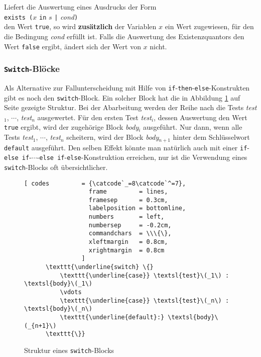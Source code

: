 \remark
Liefert die Auswertung eines Ausdrucks der Form
\\[0.2cm]
\hspace*{1.3cm}
\texttt{exists (}$x$ \texttt{in} $s$ \texttt{|} \textsl{cond}\texttt{)}
\\[0.2cm]
den Wert \texttt{true}, so wird 
\textbf{zusätzlich} der Variablen $x$ ein Wert zugewiesen, für den die Bedingung \textsl{cond}
erfüllt ist.   Falls die Auswertung des Existenzquantors den Wert \texttt{false} ergibt,
ändert sich der Wert von  $x$ nicht.


\subsubsection{\texttt{Switch}-Blöcke}
Als Alternative zur Fallunterscheidung mit Hilfe von \texttt{if}-\texttt{then}-\texttt{else}-Konstrukten
gibt es noch den \texttt{switch}-Block.  Ein solcher Block hat die  in Abbildung \ref{fig:case} auf Seite
\pageref{fig:case} gezeigte Struktur.  Bei der Abarbeitung werden der Reihe nach
die Tests \textsl{test}$_1$, $\cdots$, \textsl{test}$_n$
ausgewertet. Für den ersten Test \textsl{test}$_i$, dessen
Auswertung den Wert \texttt{true} ergibt, wird der zugehörige Block
\textsl{body}$_i$ ausgeführt.  Nur dann, wenn alle Tests 
\textsl{test}$_1$, $\cdots$, \textsl{test}$_n$
scheitern, wird der Block \textsl{body}$_{n+1}$ hinter dem Schlüsselwort
\texttt{default} ausgeführt.  Den selben Effekt könnte man natürlich auch mit
einer \texttt{if}-\texttt{else if}-$\cdots$-\texttt{else if}-\texttt{else}-Konstruktion erreichen,
nur ist die Verwendung eines \texttt{switch}-Blocks oft 
übersichtlicher.

\begin{figure}[!ht]
  \centering
\begin{Verbatim}[ codes         = {\catcode`_=8\catcode`^=7},
                  frame         = lines, 
                  framesep      = 0.3cm, 
                  labelposition = bottomline,
                  numbers       = left,
                  numbersep     = -0.2cm,
                  commandchars  = \\\{\},
                  xleftmargin   = 0.8cm,
                  xrightmargin  = 0.8cm
                ]
      \texttt{\underline{switch} \{}
          \texttt{\underline{case}} \textsl{test}\(_1\) : \textsl{body}\(_1\) 
          \vdots
          \texttt{\underline{case}} \textsl{test}\(_n\) : \textsl{body}\(_n\)
          \texttt{\underline{default}:} \textsl{body}\(_{n+1}\)
      \texttt{\}}
\end{Verbatim}
\vspace*{-0.3cm}
\caption{Struktur eines \texttt{switch}-Blocks}  \label{fig:case}
\end{figure} 

